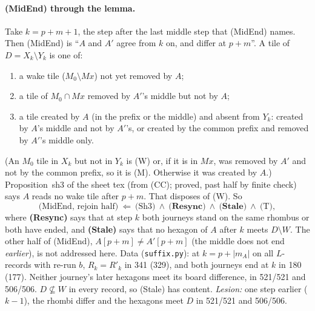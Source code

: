 \documentclass[11pt]{article}
\theoremstyle{definition}\newtheorem{definition}[theorem]{Definition}\newtheorem{remark}[theorem]{Remark}
\begin{document}
\paragraph{(MidEnd) through the lemma.} Take $k=p+m+1$, the step after the last middle step that (MidEnd) names. Then (MidEnd) is ``$A$ and $A'$ agree from $k$ on, and differ at $p+m$''. A tile of $D=X_k\setminus Y_k$ is one of:
\begin{enumerate}
\item[(W)] a wake tile ($M_0\setminus Mx$) not yet removed by $A$;
\item[(M)] a tile of $M_0\cap Mx$ removed by $A'$'s middle but not by $A$;
\item[(C)] a tile created by $A$ (in the prefix or the middle) and absent from $Y_k$: created by $A$'s middle and not by $A'$'s, or created by the common prefix and removed by $A'$'s middle only.
\end{enumerate}
(An $M_0$ tile in $X_k$ but not in $Y_k$ is (W) or, if it is in $Mx$, was removed by $A'$ and not by the common prefix, so it is (M). Otherwise it was created by $A$.) Proposition~sh3 of the sheet tex (from (CC); proved, past half by finite check) says $A$ reads no wake tile after $p+m$. That disposes of (W). So
\[\text{(MidEnd, rejoin half)}\ \Leftarrow\ \text{(Sh3)}\ \wedge\ \textbf{(Resync)}\ \wedge\ \textbf{(Stale)}\ \wedge\ \text{(T)},\]
where \textbf{(Resync)} says that at step $k$ both journeys stand on the same rhombus or both have ended, and \textbf{(Stale)} says that no hexagon of $A$ after $k$ meets $D\setminus W$. The other half of (MidEnd), $A[p+m]\ne A'[p+m]$ (the middle does not end \emph{earlier}), is not addressed here. Data (\texttt{suffix.py}): at $k=p+|m_A|$ on all $L$-records with re-run $b$, $R_k=R'_k$ in 341 (329), and both journeys end at $k$ in 180 (177). Neither journey's later hexagons meet its board difference, in 521/521 and 506/506. $D\not\subseteq W$ in every record, so (Stale) has content. \emph{Lesion:} one step earlier ($k-1$), the rhombi differ and the hexagons meet $D$ in 521/521 and 506/506.
\end{document}
